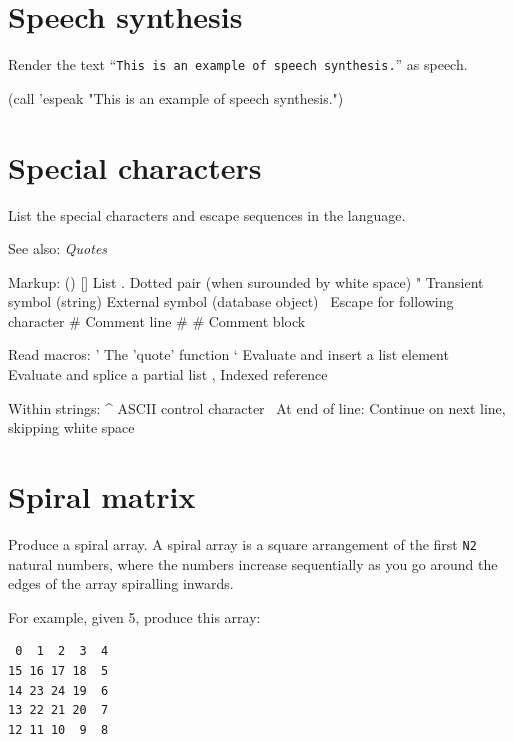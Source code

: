 \pagebreak{}
\section*{Speech synthesis}

Render the text ``\texttt{This is an example of speech synthesis.}''
as speech.

\begin{wideverbatim}

(call 'espeak "This is an example of speech synthesis.")

\end{wideverbatim}

\pagebreak{}
\section*{Special characters}

List the special characters and escape sequences in the language.

See also: \emph{Quotes}

\begin{wideverbatim}

Markup:
   () []    List
   .        Dotted pair (when surounded by white space)
   "        Transient symbol (string)
   {}       External symbol (database object)
   \        Escape for following character
   #        Comment line
   #{ }#    Comment block


Read macros:
   '        The 'quote' function
   `        Evaluate and insert a list element
   ~        Evaluate and splice a partial list
   ,        Indexed reference

Within strings:
   ^        ASCII control character
   \        At end of line: Continue on next line, skipping white space

\end{wideverbatim}

\pagebreak{}
\section*{Spiral matrix}

Produce a spiral array. A spiral array is a square arrangement of the
first \texttt{N2} natural numbers, where the numbers increase
sequentially as you go around the edges of the array spiralling inwards.

For example, given 5, produce this array:

\begin{verbatim}
 0  1  2  3  4
15 16 17 18  5
14 23 24 19  6
13 22 21 20  7
12 11 10  9  8
\end{verbatim}


